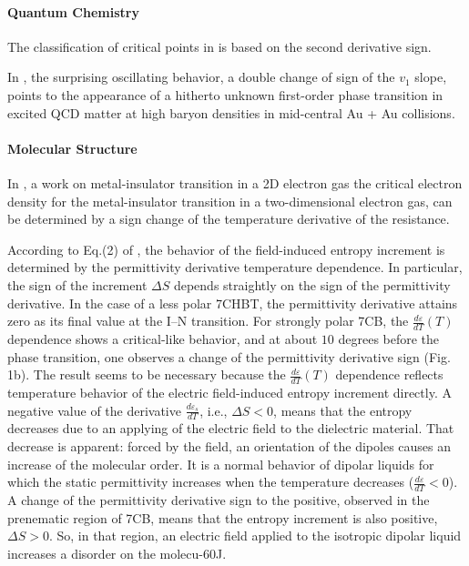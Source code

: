 \documentclass[11pt]{book}
\begin{document}
\paragraph{Quantum Chemistry}

The classification of critical points in \cite{de2019quantifying}
is based on the second derivative sign.

In \cite{nara2019sensitivity}, the surprising oscillating behavior,
a double change of sign of the $v_{1}$ slope, points to the appearance
of a hitherto unknown first-order phase transition in excited QCD
matter at high baryon densities in mid-central Au + Au collisions.


\paragraph{Molecular Structure}

In \cite{shashkin2001metal}, a work on metal-insulator transition in a 2D electron
gas the critical electron density for the
metal-insulator transition in a two-dimensional electron gas, can be
determined by a sign change of the temperature derivative of the resistance.

According to Eq.(2) of \cite{jadzyn2007interactions}, the behavior
of the field-induced entropy increment is determined by the permittivity
derivative temperature dependence. In particular, the sign of the
increment $\Delta S$ depends straightly on the sign of the permittivity
derivative. In the case of a less polar 7CHBT, the permittivity derivative
attains zero as its final value at the I--N transition. For strongly
polar 7CB, the $\frac{d\varepsilon}{dT}\left(T\right)$ dependence
shows a critical-like behavior, and at about $10$ degrees before
the phase transition, one observes a change of the permittivity derivative
sign (Fig. 1b). The result seems to be necessary because the $\frac{d\varepsilon}{dT}\left(T\right)$
dependence reflects temperature behavior of the electric field-induced
entropy increment directly. A negative value of the derivative $\frac{d\varepsilon_{s}}{dT}$,
i.e., $\Delta S<0$, means that the entropy decreases due to an applying
of the electric field to the dielectric material. That decrease is
apparent: forced by the field, an orientation of the dipoles causes
an increase of the molecular order. It is a normal behavior of dipolar
liquids for which the static permittivity increases when the temperature
decreases ($\frac{d\varepsilon}{dT}<0$). A change of the permittivity
derivative sign to the positive, observed in the prenematic region
of 7CB, means that the entropy increment is also positive, $\Delta S>0$.
So, in that region, an electric field applied to the isotropic dipolar
liquid increases a disorder on the molecu-60J.
\end{document}
